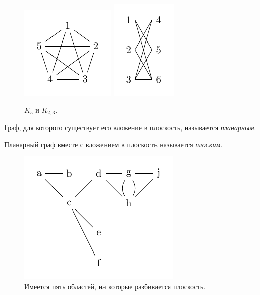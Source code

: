 \begin{figure}[h]
    \centering
    \includegraphics[scale=2]{images/6.pdf}
    \includegraphics[scale=2]{images/7.pdf}
    \caption{$K_5$ и $K_{2,3}$.}
    \label{fig:6}
\end{figure}

\begin{definition}
    Граф, для которого существует его вложение в плоскость, называется \textit{планарным}.
\end{definition}

\begin{definition}
    Планарный граф вместе с вложением в плоскость называется \textit{плоским}.
\end{definition}

\begin{figure}[h]
    \centering
    \includegraphics[scale=2]{images/8.pdf}
    \caption{Имеется пять областей, на которые разбивается плоскость.}
    \label{fig:7}
\end{figure}

